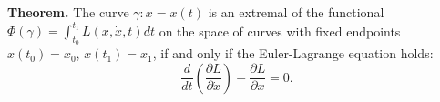 \textbf{Theorem.} The curve $\gamma: x = x(t)$ is an extremal of the functional $\Phi(\gamma) = \int_{t_0}^{t_1} L(x, \dot{x}, t) dt$ on the space of curves with fixed endpoints $x(t_0) = x_0$, $x(t_1) = x_1$, if and only if the Euler-Lagrange equation holds:
$$\frac{d}{dt}\left(\frac{\partial L}{\partial \dot{x}}\right) - \frac{\partial L}{\partial x} = 0.$$
